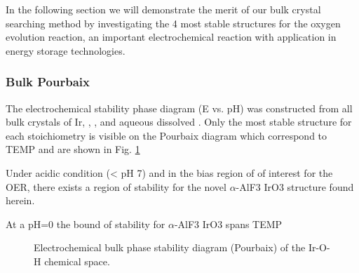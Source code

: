 
In the following section we will demonstrate the merit of our bulk crystal searching method by investigating the 4 most stable structures for the oxygen evolution reaction, an important electrochemical reaction with application in energy storage technologies.


\subsubsection{Bulk Pourbaix}

The electrochemical stability phase diagram (E vs. pH) was constructed from all bulk crystals of Ir, , , and aqueous dissolved .
Only the most stable structure for each stoichiometry is visible on the Pourbaix diagram which correspond to TEMP and are shown in Fig. \ref{fig:bulk_pourbaix}

Under acidic condition (< pH 7) and in the bias region of of interest for the OER, there exists a region of stability for the novel $\alpha$-AlF3 IrO3 structure found herein.

At a pH=0 the bound of stability for $\alpha$-AlF3 IrO3 spans TEMP

\begin{figure}
\centering
{}
\caption{\label{fig:bulk_pourbaix}
Electrochemical bulk phase stability diagram (Pourbaix) of the Ir-O-H chemical space.
}
\end{figure}

